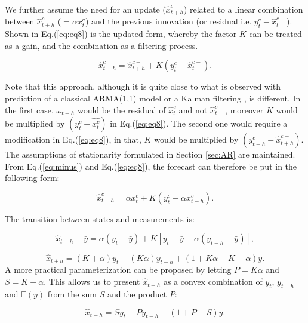 We further assume the need for an update ($\widehat{x}^c_{t+h}$) related to a linear combination between $\widehat{x}^{c-}_{t+h}$ ($=\alpha x^c_t$) and the previous innovation (or residual i.e. $y^c_{t}-\widehat{x}^{c-}_{t}$). Shown in Eq.(\ref{eq:eq8}) is the updated form, whereby the factor $K$ can be treated as a gain, and the combination as a filtering process. 

\begin{equation}
\label{eq:eq8}
\widehat{x}^c_{t+h}=\widehat{x}^{c-}_{t+h}+K(y^c_{t}-\widehat{x}^{c-}_{t}).
\end{equation}

Note that this approach, although it is quite close to what is observed with prediction of a classical ARMA(1,1) model \citep{CHATFIELD1988411} or a Kalman filtering \citep{DEGOOIJER2006443}, is different. In the first case, $\omega_{t+h}$  would be the residual of $\widehat{x}^c_{t}$ and not $\widehat{x}^{c-}_{t}$, moreover $K$ would be multiplied by $(y^c_{t}-\widehat{x^c_{t}})$ in Eq.(\ref{eq:eq8}). The second one would require a modification in Eq.(\ref{eq:eq8}), in that, $K$ would be multiplied by $(y^c_{t+h}-\widehat{x}^{c-}_{t+h})$. The assumptions of stationarity formulated in Section \ref{sec:AR} are maintained. From Eq.(\ref{eq:minus}) and Eq.(\ref{eq:eq8}), the forecast can therefore be put in the following form:

\begin{equation}
\label{eq:eq8bis}
\widehat{x}^c_{t+h}=\alpha x^c_t+K(y^c_t-\alpha x^c_{t-h}).
\end{equation}

The transition between states and measurements is:

\begin{equation}
\label{eq:eq8ter}
\widehat{x}_{t+h}-\bar{y}=\alpha(y_t-\bar{y})+K[y_t-\bar{y}-\alpha(y_{t-h}-\bar{y})], 
\end{equation}

\begin{equation}
\label{eq:eq8b}
\widehat{x}_{t+h}=(K+\alpha)y_t-(K\alpha)y_{t-h}+(1+K\alpha-K-\alpha)\bar{y}.
\end{equation}
A more practical parameterization can be proposed by letting $P=K\alpha$ and $S=K+\alpha$. This allows us to present $\widehat{x}_{t+h}$ as a convex combination of $y_t$, $y_{t-h}$ and $\mathbb{E}(y)$ from the sum $S$ and the product $P$:

\begin{equation}
\label{eq:eq8c}
\widehat{x}_{t+h}=Sy_t-Py_{t-h}+(1+P-S)\bar{y}.
\end{equation}


